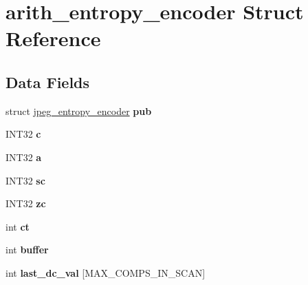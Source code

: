 \hypertarget{structarith__entropy__encoder}{}\section{arith\+\_\+entropy\+\_\+encoder Struct Reference}
\label{structarith__entropy__encoder}
\subsection*{Data Fields}
\begin{DoxyCompactItemize}
\item 
\mbox{\label{structarith__entropy__encoder_a1f8fba730cff996676719295f1d77c6f}} 
struct \hyperlink{structjpeg__entropy__encoder}{jpeg\+\_\+entropy\+\_\+encoder} {\bfseries pub}
\item 
\mbox{\label{structarith__entropy__encoder_a4e0e457e39bddc05b3d661565ad18c61}} 
I\+N\+T32 {\bfseries c}
\item 
\mbox{\label{structarith__entropy__encoder_a9c1a5b250cc6b8764890cce115391517}} 
I\+N\+T32 {\bfseries a}
\item 
\mbox{\label{structarith__entropy__encoder_ae548e54edd2b18b0c638a258377c2db7}} 
I\+N\+T32 {\bfseries sc}
\item 
\mbox{\label{structarith__entropy__encoder_aecf450abfb41d02397fbc327eae645cd}} 
I\+N\+T32 {\bfseries zc}
\item 
\mbox{\label{structarith__entropy__encoder_a55ca1a06f8591241cf96128f403e8f64}} 
int {\bfseries ct}
\item 
\mbox{\label{structarith__entropy__encoder_a0c7afc3fbe2c84da5f8852c76839b03b}} 
int {\bfseries buffer}
\item 
\mbox{\label{structarith__entropy__encoder_a9617d03ea0b915e3b718eea8c0948492}} 
int {\bfseries last\+\_\+dc\+\_\+val} \mbox{[}M\+A\+X\+\_\+\+C\+O\+M\+P\+S\+\_\+\+I\+N\+\_\+\+S\+C\+AN\mbox{]}

\end{DoxyCompactItemize}
